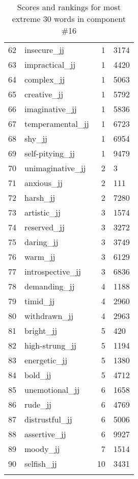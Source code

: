 \begin{longtable}[!htbp]{| rlr@{.}l |}
    62 & insecure\_jj & 1 & 3174 \\
    63 & impractical\_jj & 1 & 4420 \\
    64 & complex\_jj & 1 & 5063 \\
    65 & creative\_jj & 1 & 5792 \\
    66 & imaginative\_jj & 1 & 5836 \\
    67 & temperamental\_jj & 1 & 6723 \\
    68 & shy\_jj & 1 & 6954 \\
    69 & self-pitying\_jj & 1 & 9479 \\
    70 & unimaginative\_jj & 2 & 3 \\
    71 & anxious\_jj & 2 & 111 \\
    72 & harsh\_jj & 2 & 7280 \\
    73 & artistic\_jj & 3 & 1574 \\
    74 & reserved\_jj & 3 & 3272 \\
    75 & daring\_jj & 3 & 3749 \\
    76 & warm\_jj & 3 & 6129 \\
    77 & introspective\_jj & 3 & 6836 \\
    78 & demanding\_jj & 4 & 1188 \\
    79 & timid\_jj & 4 & 2960 \\
    80 & withdrawn\_jj & 4 & 2963 \\
    81 & bright\_jj & 5 & 420 \\
    82 & high-strung\_jj & 5 & 1194 \\
    83 & energetic\_jj & 5 & 1380 \\
    84 & bold\_jj & 5 & 4712 \\
    85 & unemotional\_jj & 6 & 1658 \\
    86 & rude\_jj & 6 & 4769 \\
    87 & distrustful\_jj & 6 & 5006 \\
    88 & assertive\_jj & 6 & 9927 \\
    89 & moody\_jj & 7 & 1514 \\
    90 & selfish\_jj & 10 & 3431 \\
    \hline
    \caption{Scores and rankings for most extreme 30 words in component \#16} \\
\end{longtable}
